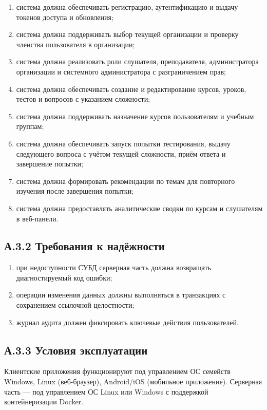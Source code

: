 \begin{enumerate}
  \item система должна обеспечивать регистрацию, аутентификацию и выдачу токенов доступа и обновления;
  \item система должна поддерживать выбор текущей организации и проверку членства пользователя в организации;
  \item система должна реализовать роли слушателя, преподавателя, администратора организации и системного администратора с разграничением прав;
  \item система должна обеспечивать создание и редактирование курсов, уроков, тестов и вопросов с указанием сложности;
  \item система должна поддерживать назначение курсов пользователям и учебным группам;
  \item система должна обеспечивать запуск попытки тестирования, выдачу следующего вопроса с учётом текущей сложности, приём ответа и завершение попытки;
  \item система должна формировать рекомендации по темам для повторного изучения после завершения попытки;
  \item система должна предоставлять аналитические сводки по курсам и слушателям в веб-панели.
\end{enumerate}

\subsection*{А.3.2 Требования к надёжности}

\begin{enumerate}
  \item при недоступности СУБД серверная часть должна возвращать диагностируемый код ошибки;
  \item операции изменения данных должны выполняться в транзакциях с сохранением ссылочной целостности;
  \item журнал аудита должен фиксировать ключевые действия пользователей.
\end{enumerate}

\subsection*{А.3.3 Условия эксплуатации}

Клиентские приложения функционируют под управлением ОС семейств Windows, Linux (веб-браузер), Android/iOS (мобильное приложение). Серверная часть --- под управлением ОС Linux или Windows с поддержкой контейнеризации Docker.

